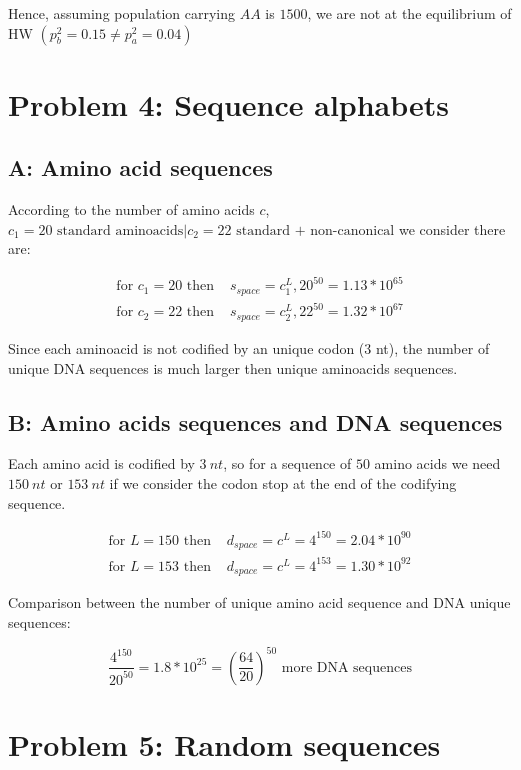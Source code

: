 Hence, assuming population carrying $AA$ is $1500$, we are not at the equilibrium of HW $(p^{2}_b = 0.15 \neq p^{2}_a = 0.04)$

\setcounter{chapter}{4}
\setcounter{section}{0}
\section{Problem 4: Sequence alphabets}

\subsection{A: Amino acid sequences}

According to the number of amino acids $c$, $c_1 = 20 \text{ standard aminoacids} | c_2 = 22 \text{ standard + non-canonical}$ we consider there are:

\begin{align}
\text{for } c_1 = 20 \text{ then } &s_{space} = c_1^L, 20^{50} = 1.13*10^{65}\\
\text{for } c_2 = 22 \text{ then } &s_{space} = c_2^L, 22^{50} = 1.32*10^{67}
\end{align}

Since each aminoacid is not codified by an unique codon (3 nt), the number of unique DNA sequences is much larger then unique aminoacids sequences.


\subsection{B: Amino acids sequences and DNA sequences}

Each amino acid is codified by $3~nt$, so for a sequence of $50$ amino acids we need $150~nt$ or $153~nt$ if we consider the codon stop at the end of the codifying sequence.

\begin{align}
\text{for } L = 150 \text{ then } &d_{space} = c^L =  4^{150} = 2.04*10^{90}\\
\text{for } L = 153 \text{ then } &d_{space} = c^L =  4^{153} = 1.30*10^{92}
\end{align}

Comparison between the number of unique amino acid sequence and DNA unique sequences:

\[ \frac{4^{150}}{20^{50}} = 1.8 *10^{25} = (\frac{64}{20})^{50} \text{ more DNA sequences} \]

\setcounter{chapter}{5}
\setcounter{section}{0}
\section{Problem 5: Random sequences}

